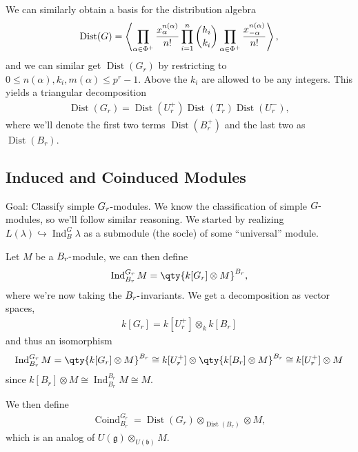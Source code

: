 We can similarly obtain a basis for the distribution algebra
\begin{align*}   \operatorname{Dist}(G) = \left\langle{  \prod_{\alpha\in\Phi^+} { x_{\alpha}^{n(\alpha)} \over n!}  \prod_{i=1}^n {h_i \choose k_i}  \prod_{\alpha\in\Phi^+} { x_{-\alpha}^{n(\alpha)} \over n!}  }\right\rangle ,\end{align*}
and we can similar get \(\operatorname{Dist}(G_r)\) by restricting to
\(0\leq n(\alpha), k_i, m(\alpha) \leq p^r - 1\). Above the \(k_i\) are
allowed to be any integers. This yields a triangular decomposition
\begin{align*}   \operatorname{Dist}(G_r) = \operatorname{Dist}(U_r^+) \operatorname{Dist}(T_r) \operatorname{Dist}(U_r^-) ,\end{align*}
where we'll denote the first two terms \(\operatorname{Dist}(B_r^+)\)
and the last two as \(\operatorname{Dist}(B_r)\).

\hypertarget{induced-and-coinduced-modules}{%
\subsection{Induced and Coinduced
Modules}\label{induced-and-coinduced-modules}}

Goal: Classify simple \(G_r{\hbox{-}}\)modules. We know the
classification of simple \(G{\hbox{-}}\)modules, so we'll follow similar
reasoning. We started by realizing
\(L(\lambda) \hookrightarrow\operatorname{Ind}_B^G \lambda\) as a
submodule (the socle) of some ``universal'' module.

Let \(M\) be a \(B_r{\hbox{-}}\)module, we can then define
\begin{align*}   \operatorname{Ind}_{B_r}^{G_r}M = \qty{k[G_r] \otimes M }^{B_r} ,\end{align*}
where we're now taking the \(B_r{\hbox{-}}\)invariants. We get a
decomposition as vector spaces,
\begin{align*}   k[G_r] = k[U_r^+] \otimes_k k[B_r] \end{align*} and
thus an isomorphism
\begin{align*}   \operatorname{Ind}_{B_r}^{G_r}M = \qty{k[G_r] \otimes M }^{B_r}  \cong k[U_r^+] \otimes\qty{ k[B_r] \otimes M}^{B_r} \cong k[U_r^+] \otimes M \end{align*}
since
\(k[B_r]\otimes M \cong \operatorname{Ind}_{B_r}^{B_r} M \cong M\).

We then define
\begin{align*}   \operatorname{Coind}_{B_r}^{G_r} = \operatorname{Dist}(G_r) \otimes_{\operatorname{Dist}(B_r)} \otimes M ,\end{align*}
which is an analog of
\(U({\mathfrak{g}})\otimes_{U({\mathfrak{b}})} M\).

